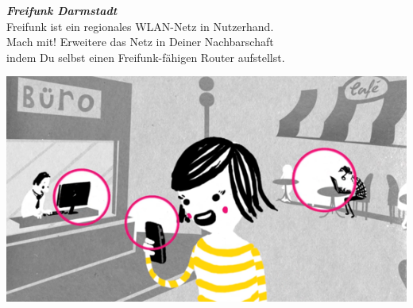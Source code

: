 \documentclass[a4paper]{article}
\begin{document}
\thispagestyle{empty}

\begin{center}
\Huge \textit{\textbf{\textcolor{freifunkpink}{Freifunk Darmstadt}}} \\
\vspace{0.6cm}
\large
Freifunk ist ein regionales WLAN-Netz in Nutzerhand.\\
Mach mit! Erweitere das Netz in Deiner Nachbarschaft\\
indem Du selbst einen Freifunk-fähigen Router aufstellst.
\normalsize

\vspace{1.7cm}

\hspace*{-0.05 \paperwidth}\includegraphics[width=\paperwidth]{../images/city_center}
\end{center}

\vspace{0.8cm}
\end{document}
